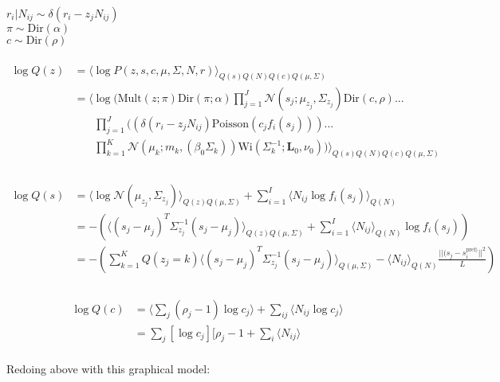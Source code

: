\documentclass[12pt]{article}
\begin{document}
$r_i|N_{ij} \sim \delta(r_i - z_j N_{ij})$\\
$\pi \sim \text{Dir} (\alpha)$\\
$c \sim \text{Dir} (\rho)$\\
\\
\begin{equation}
\begin{aligned}
\log Q(z) &= \langle \log P(z, s, c, \mu, \Sigma, N, r) \rangle_{Q(s)Q(N)Q(c)Q(\mu, \Sigma)}\\
&= \langle \log(\text{Mult}(z; \pi) \text{Dir}(\pi; \alpha) \prod_{j=1}^J \mathcal{N}(s_j; \mu_{z_j}, \Sigma_{z_j}) \text{Dir}(c, \rho)...\\
& \phantom{{}=1} \prod_{j=1}^J ((\delta(r_i - z_j N_{ij}) \text{Poisson}(c_j f_i(s_j)))...\\
& \phantom{{}=1} \prod_{k=1}^K \mathcal{N}(\mu_k; m_k, (\beta_0 \Sigma_k)) \text{Wi}(\Sigma_k^{-1}; \textbf{L}_0 ,\nu_0)) \rangle_{Q(s)Q(N)Q(c)Q(\mu, \Sigma)}\\
\end{aligned}
\end{equation}
\\
\begin{equation}
\begin{aligned}
\log Q(s) &= \langle \log \mathcal{N}(\mu_{z_j}, \Sigma_{z_j}) \rangle_{Q(z)Q(\mu, \Sigma)} + \sum_{i=1}^I \langle N_{ij} \log f_i(s_j) \rangle_{Q(N)}\\
&= - (\langle (s_j - \mu_j)^T \Sigma_{z_j}^{-1} (s_j - \mu_j) \rangle_{Q(z)Q(\mu, \Sigma)} + \sum_{i=1}^I \langle N_{ij} \rangle_{Q(N)} \log f_i(s_j))\\
&= - (\sum_{k=1}^K Q(z_j = k)\langle (s_j - \mu_j)^T \Sigma_{z_j}^{-1} (s_j - \mu_j) \rangle_{Q(\mu, \Sigma)} - \langle N_{ij} \rangle_{Q(N)} \frac{||(s_j - s_i^{\text{pref})}||^2}{L})\\
\end{aligned}
\end{equation}
\\
\begin{equation}
\begin{aligned}
\log Q(c) &= \langle \sum_j (\rho_j - 1) \log c_j \rangle + \sum_{ij} \langle N_{ij} \log c_j \rangle\\
&= \sum_j [\log c_j][\rho_j - 1 + \sum_i \langle N_{ij} \rangle
\end{aligned}
\end{equation}
\\
Redoing above with this graphical model:\\
\end{document}
